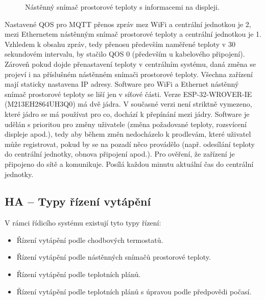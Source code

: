 \begin{figure}[H]
\caption{Nástěnný snímač prostorové teploty s informacemi na displeji.}
\label{fig:software-hanastenny-snimac-prostorove-teploty-zapnuty-displej}
\end{figure}

Nastavené QOS pro MQTT přenos zpráv mez WiFi a centrální jednotkou je 2, mezi Ethernetem nástěnným snímač prostorové teploty a centrální jednotkou je 1. Vzhledem k obsahu zpráv, tedy přenosu především naměřené teploty v 30 sekundovém intervalu, by stačilo QOS 0 (především u kabelového připojení). Zároveň pokud dojde přenastavení teploty v centrálním systému, daná změna se projeví i na příslušném nástěnném snímači prostorové teploty. Všechna zařízení mají staticky nastavena IP adresy. Software pro WiFi a Ethernet nástěnný snímač prostorové teploty se liší jen v síťové části. Verze ESP-32-WROVER-IE (M213EH2864UH3Q0) má dvě jádra. V současné verzi není striktně vymezeno, které jádro se má používat pro co, dochází k přepínání mezi jádry. Software je udělán s prioritou pro změny uživatele (změna požadované teploty, rozsvícení displeje apod.), tedy aby během změn nedocházelo k prodlevám, které uživatel může registrovat, pokud by se na pozadí něco provádělo (např. odesílání teploty do centrální jednotky, obnova připojení apod.). Pro ověření, že zařízení je připojeno do sítě a komunikuje. Posílá každou minutu aktuální čas do centrální jednotky.


\newpage

\subsection{HA – Typy řízení vytápění}

\label{sec:typy-rizeni-vytapeni}
V rámci řídicího systému existují tyto typy řízení:

\begin{itemize}
  \item Řízení vytápění podle chodbových termostatů.
  \item Řízení vytápění podle nástěnných snímačů prostorové teploty.
  \item Řízení vytápění podle teplotních plánů.
  \item Řízení vytápění podle teplotních plánů s úpravou podle předpovědi počasí.
\end{itemize}

